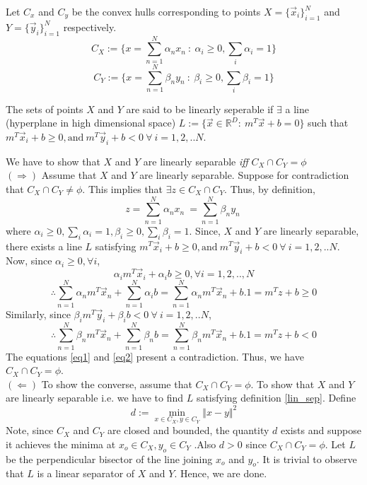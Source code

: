 \documentclass[a4paper,11pt]{article}
\begin{document}
\begin{mlsolution}

Let $C_x$ and $C_y$ be the convex hulls corresponding to points $X = \{\vec{x}_i\}^{N}_{i=1}$ and $Y = \{\vec{y}_i\}^{N}_{i=1}$ respectively. 
\[
C_X := \{  x = \sum_{n=1}^{N}\alpha_n x_n \ : \ \alpha_i \geq 0, \sum_{i}\alpha_i = 1 \}
\]
\vspace{-2mm}
\[
C_Y := \{  x = \sum_{n=1}^{N}\beta_n y_n \ : \ \beta_i \geq 0, \sum_{i}\beta_i = 1 \}
\]

\begin{definition}
	\label{lin_sep}
	The sets of points $X$ and $Y$ are said to be linearly seperable if $\exists$ a line (hyperplane in high dimensional space) $L := \{ \vec{x}\in \mathbb{R}^{D} : \ m^{T}\vec{x} + b = 0 \}$ such that $m^{T}\vec{x}_i + b \geq 0, \text{and} \  m^{T}\vec{y}_i + b < 0 \ \forall \ i = 1,2,..N$.
\end{definition}
We have to show that $X$ and $Y$ are linearly separable \textit{iff} $C_X \cap C_Y = \phi$ \\

$(\Rightarrow)$ Assume that $X$ and $Y$ are linearly separable. Suppose for contradiction that $C_X \cap C_Y \neq \phi$. This implies that $\exists z \in C_X \cap C_Y$. Thus, by definition, 
\[
z = \sum_{n=1}^{N}\alpha_n x_n \ = \sum_{n=1}^{N}\beta_n y_n \
\]
where $\alpha_i \geq 0, \sum_{i}\alpha_i = 1, \beta_i \geq 0, \sum_{i}\beta_i = 1$. Since, $X$ and $Y$ are linearly separable, there exists a line $L$ satisfying $m^{T}\vec{x}_i + b \geq 0, \text{and} \  m^{T}\vec{y}_i + b < 0 \ \forall \ i = 1,2,..N$.  Now, since $\alpha_i \geq 0, \forall i$, 
\[
\alpha_im^{T}\vec{x}_i + \alpha_ib \geq 0, \forall i = 1,2,..,N
\]
\begin{equation}
\label{eq1}
\therefore \sum_{n=1}^{N} \alpha_n m^{T}\vec{x}_n + \sum_{n=1}^{N}\alpha_i b = \sum_{n=1}^{N} \alpha_n m^{T}\vec{x}_n + b.1 = m^{T}z + b \geq 0
\end{equation}
Similarly, since $\beta_im^{T}\vec{y}_i + \beta_ib < 0 \ \forall \ i = 1,2,..N$,
\begin{equation}
\label{eq2}
\therefore \sum_{n=1}^{N} \beta_n m^{T}\vec{x}_n + \sum_{n=1}^{N}\beta_n b = \sum_{n=1}^{N} \beta_n m^{T}\vec{x}_n + b.1 = m^{T}z + b < 0
\end{equation}
The equations \ref{eq1} and \ref{eq2} present a contradiction. Thus, we have $C_X \cap C_Y = \phi$.\\

$(\Leftarrow)$ To show the converse, assume that $C_X \cap C_Y = \phi$. To show that $X$ and $Y$ are linearly separable i.e. we have to find $L$ satisfying definition \ref{lin_sep}. Define
\[
d := \min_{x \in C_X ,y \in C_Y}\Vert x - y \Vert^{2}
\]
Note, since $C_X$ and $C_Y$ are closed and bounded, the quantity $d$ exists and suppose it achieves the minima at $x_o \in C_X, y_o \in C_Y$ .Also $d>0$ since $C_X \cap C_Y = \phi$. Let $L$ be the perpendicular bisector of the line joining $x_o$ and $y_o$.  It is trivial to observe that $L$ is a linear separator of $X$ and $Y$. Hence, we are done.


\end{mlsolution}
\end{document}
